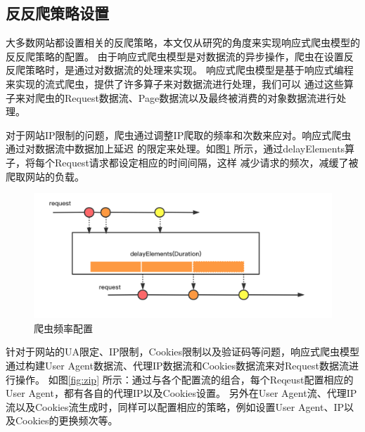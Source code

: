 \documentclass[master]{njuthesis}
\begin{document}
\subsection{反反爬策略设置}\label{section-anti}
大多数网站都设置相关的反爬策略，本文仅从研究的角度来实现响应式爬虫模型的反反爬策略的配置。
由于响应式爬虫模型是对数据流的异步操作，爬虫在设置反反爬策略时，是通过对数据流的处理来实现。
响应式爬虫模型是基于响应式编程来实现的流式爬虫，提供了许多算子来对数据流进行处理，我们可以
通过这些算子来对爬虫的Request数据流、Page数据流以及最终被消费的对象数据流进行处理。

对于网站IP限制的问题，爬虫通过调整IP爬取的频率和次数来应对。响应式爬虫通过对数据流中数据加上延迟
的限定来处理。如图\ref{fig:delay} 所示，通过delayElements算子，将每个Request请求都设定相应的时间间隔，这样
减少请求的频次，减缓了被爬取网站的负载。


\begin{figure}[htbp]
\centering
\includegraphics[width= 1\textwidth]{pic/delay.png}
\caption{爬虫频率配置}\label{fig:delay}
\end{figure}

针对于网站的UA限定、IP限制，Cookies限制以及验证码等问题，响应式爬虫模型通过构建User Agent数据流、代理IP数据流和Cookies数据流来对Request数据流进行操作。
如图\ref{fig:zip} 所示：通过与各个配置流的组合，每个Reqeust配置相应的User Agent，都有各自的代理IP以及Cookies设置。
另外在User Agent流、代理IP流以及Cookies流生成时，同样可以配置相应的策略，例如设置User Agent、IP以及Cookies的更换频次等。
\end{document}
